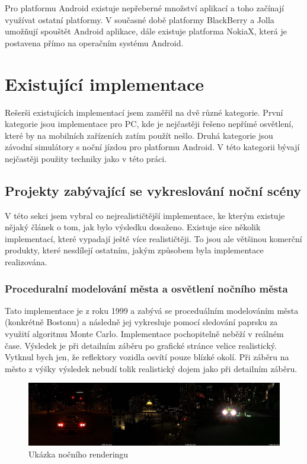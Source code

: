 \documentclass[11pt,twoside,a4paper]{book}
\begin{document}
Pro platformu Android existuje nepřeberné množství aplikací a toho začínají využívat ostatní platformy. V současné době platformy BlackBerry a Jolla umožňují spouštět Android aplikace, dále existuje platforma NokiaX, která je postavena přímo na operačním systému Android.

\section{Existující implementace}

Rešerši existujících implementací jsem zaměřil na dvě různé kategorie. První kategorie jsou implementace pro PC, kde je nejčastěji řešeno nepřímé osvětlení, které by na mobilních zařízeních zatím použít nešlo. Druhá kategorie jsou závodní simulátory s noční jízdou pro platformu Android. V této kategorii bývají nejčastěji použity techniky jako v této práci.

\subsection{Projekty zabývající se vykreslování noční scény}

V této sekci jsem vybral co nejrealističtější implementace, ke kterým existuje nějaký článek o tom, jak bylo výsledku dosaženo. Existuje sice několik implementací, které vypadají ještě více realističtěji. To jsou ale většinou komerční produkty, které nesdílejí ostatním, jakým způsobem byla implementace realizována.

\subsubsection{Proceduralní modelování města a osvětlení nočního města}
Tato implementace je z roku 1999 a zabývá se proceduálním modelováním města (konkrétně Bostonu) a následně jej vykresluje pomocí sledování paprsku za využití algoritmu Monte Carlo. Implementace pochopitelně neběží v reálném čase. Výsledek je při detailním záběru po grafické stránce velice realistický. Vytknul bych jen, že reflektory vozidla osvítí pouze blízké okolí. Při záběru na město z výšky výsledek nebudí tolik realistický dojem jako při detailním záběru.

\begin{center}
\begin{figure}[h!]
\includegraphics[width=150mm]{figures/NR.png}
\caption{Ukázka nočního renderingu}
\end{figure}
\end{center}
\newpage
\end{document}
